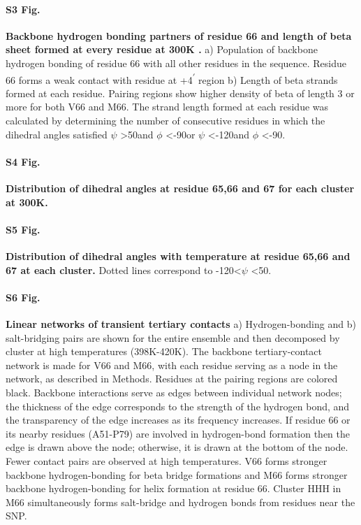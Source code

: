 \documentclass[10pt,letterpaper]{article}
\begin{document}
\paragraph*{S3 Fig.}
\label{S3_Fig} 
{\bf Backbone hydrogen bonding partners of residue 66 and length of beta sheet formed at every residue at 300K .}
a) Population of backbone hydrogen bonding of residue 66 with all other residues in the sequence. Residue 66 forms a weak contact with residue at +4\textsuperscript{$\prime$} region b) Length of beta strands formed at each residue. Pairing regions show higher density of beta of length 3 or more for both V66 and M66. The strand length formed at each residue was calculated by determining the number of consecutive residues in which the dihedral angles satisfied $\psi$ \textgreater 50\textdegree and $\phi$ \textless -90\textdegree  or $\psi$ \textless -120\textdegree and $\phi$ \textless -90\textdegree.

\paragraph*{S4 Fig.}
\label{S4_Fig} 
{\bf Distribution of dihedral angles at residue 65,66 and 67 for each cluster at 300K.}

\paragraph*{S5 Fig.}
\label{S5_Fig} 
{\bf Distribution of dihedral angles with temperature at residue 65,66 and 67 at each cluster.}
Dotted lines correspond to  -120\textdegree \textless  $\psi$ \textless  50\textdegree. 

\paragraph*{S6 Fig.}
\label{S6_Fig} 
{\bf Linear networks of transient tertiary contacts} a) Hydrogen-bonding and b) salt-bridging pairs are shown for the entire ensemble and then decomposed by cluster at high temperatures (398K-420K). The backbone tertiary-contact network is made for V66 and M66, with each residue serving as a node in the network, as described in Methods. Residues at the pairing regions  
are colored black. Backbone interactions serve as edges between individual network nodes; the thickness of the edge corresponds to the strength of the hydrogen bond, and the transparency of the edge increases as its frequency increases. If residue 66 or its nearby residues (A51-P79) are involved in hydrogen-bond formation then the edge is drawn above the node; otherwise, it is drawn at the bottom of the node. Fewer contact pairs are observed at high temperatures. V66 forms stronger backbone hydrogen-bonding for beta bridge formations and M66 forms stronger backbone hydrogen-bonding for helix formation at residue 66. Cluster HHH in M66 simultaneously forms salt-bridge and hydrogen bonds from residues near the SNP. 
\end{document}
